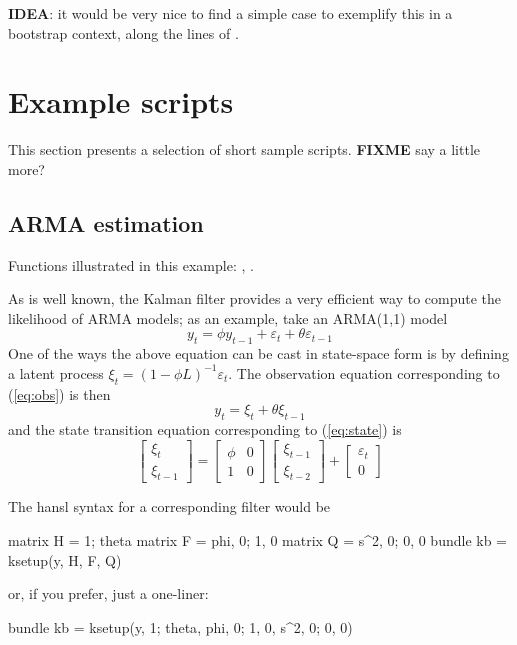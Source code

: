 \documentclass[a4paper]{article}
\begin{document}
\textbf{IDEA}: it would be very nice to find a simple case to
exemplify this in a bootstrap context, along the lines of 
\cite{stoffer-wall91}.

\section{Example scripts}
\label{sec:examples}

This section presents a selection of short sample
scripts. \textbf{FIXME} say a little more?

\subsection{ARMA estimation}
\label{sec:example_arma}

Functions illustrated in this example: , .

As is well known, the Kalman filter provides a very efficient way to
compute the likelihood of ARMA models; as an example, take an
ARMA(1,1) model
\[
  y_t = \phi y_{t-1} + \varepsilon_t + \theta \varepsilon_{t-1}
\]
One of the ways the above equation can be cast in state-space form is
by defining a latent process $\xi_t = (1 - \phi L)^{-1}
\varepsilon_t$.   The observation equation corresponding to (\ref{eq:obs})
is then
%
\begin{equation}
y_t = \xi_t + \theta \xi_{t-1} \label{eq:arma-meas}
\end{equation}
%
and the state transition equation corresponding to (\ref{eq:state}) is
%
\[
  \left[ \begin{array}{c} \xi_t \\ \xi_{t-1} \end{array} \right] =
  \left[ \begin{array}{cc} \phi & 0 \\ 1 & 0 \end{array} \right]
  \left[ \begin{array}{c} \xi_{t-1} \\ \xi_{t-2} \end{array} \right] +
  \left[ \begin{array}{c} \varepsilon_t \\ 0 \end{array} \right] 
\]

The \textsf{hansl} syntax for a corresponding filter would be
\begin{code}
matrix H = {1; theta}
matrix F = {phi, 0; 1, 0}
matrix Q = {s^2, 0; 0, 0}
bundle kb = ksetup(y, H, F, Q)
\end{code}
%
or, if you prefer, just a one-liner:
\begin{code}
bundle kb = ksetup(y, {1; theta}, {phi, 0; 1, 0}, {s^2, 0; 0, 0})
\end{code}
\end{document}
